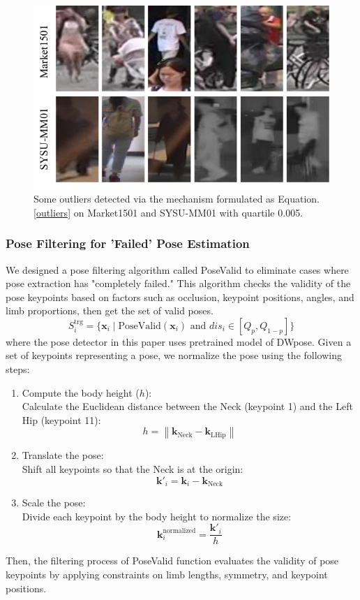 \begin{figure}
\centering
\includegraphics[width=0.8\linewidth]{figs/pdf/outliers.pdf}
\caption{Some outliers detected via the mechanism formulated as Equation.\ref{outliers} on Market1501 and SYSU-MM01 with quartile 0.005.}
\label{fig:outliers}
\end{figure}


\subsubsection{Pose Filtering for 'Failed' Pose Estimation}
\label{PoseValid}
We designed a pose filtering algorithm called PoseValid to eliminate cases where pose extraction has "completely failed." This algorithm checks the validity of the pose keypoints based on factors such as occlusion, keypoint positions, angles, and limb proportions, then get the set of valid poses.
\begin{equation}
S^{\text{trg}}_i = \{ \mathbf{x}_i \mid \text{PoseValid}(\mathbf{x}_i) \text{ and } dis_i \in [Q_p, Q_{1-p}] \}
\end{equation}
where the pose detector in this paper uses pretrained model of DWpose\cite{yang2023effective}. Given a set of keypoints representing a pose, we normalize the pose using the following steps:
\begin{enumerate}
    \item Compute the body height ($h$):\\
    Calculate the Euclidean distance between the Neck (keypoint 1) and the Left Hip (keypoint 11):
    \[
    h = \left\| \mathbf{k}_{\text{Neck}} - \mathbf{k}_{\text{LHip}} \right\|
    \]
    \item Translate the pose:\\
    Shift all keypoints so that the Neck is at the origin:
    \[
    \mathbf{k}'_i = \mathbf{k}_i - \mathbf{k}_{\text{Neck}}
    \]
    \item Scale the pose:\\
    Divide each keypoint by the body height to normalize the size:
    \[
    \mathbf{k}^{\text{normalized}}_i = \frac{\mathbf{k}'_i}{h}
    \]
\end{enumerate}
Then, the filtering process of PoseValid function evaluates the validity of pose keypoints by applying constraints on limb lengths, symmetry, and keypoint positions. 

